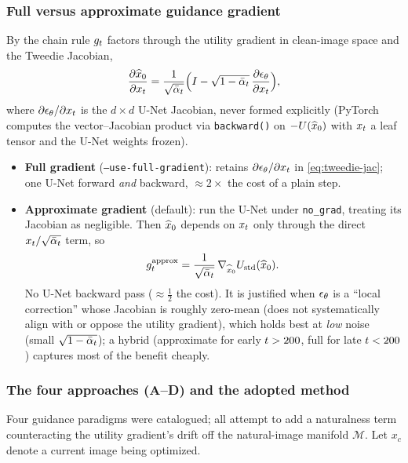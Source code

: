 \subsubsection{Full versus approximate guidance gradient}\label{sec:diff-approx}
By the chain rule $g_{t}$ factors through the utility gradient in clean-image
space and the Tweedie Jacobian,
\begin{equation}
\frac{\partial\widehat{x}_{0}}{\partial x_{t}}
   =\frac{1}{\sqrt{\bar{\alpha}_{t}}}\Big(I-\sqrt{1-\bar{\alpha}_{t}}\,\frac{\partial\epsilon_{\theta}}{\partial x_{t}}\Big),
\label{eq:tweedie-jac}
\end{equation}
where $\partial\epsilon_{\theta}/\partial x_{t}$ is the $d\times d$ U-Net Jacobian, never formed
explicitly (PyTorch computes the vector--Jacobian product via
\texttt{backward()} on $-U(\widehat{x}_{0})$ with $x_{t}$ a leaf tensor and the U-Net weights
frozen).
\begin{itemize}[leftmargin=1.4em,itemsep=1pt,topsep=2pt]
  \item \textbf{Full gradient} (\texttt{--use-full-gradient}): retains
        $\partial\epsilon_{\theta}/\partial x_{t}$ in \eqref{eq:tweedie-jac}; one U-Net forward
        \emph{and} backward, $\approx2\times$ the cost of a plain step.
  \item \textbf{Approximate gradient} (default): run the U-Net under
        \texttt{no\_grad}, treating its Jacobian as negligible. Then $\widehat{x}_{0}$
        depends on $x_{t}$ only through the direct $x_{t}/\sqrt{\bar{\alpha}_{t}}$ term, so
        \begin{equation}
        g_{t}^{\mathrm{approx}}=\frac{1}{\sqrt{\bar{\alpha}_{t}}}\,\nabla_{\widehat{x}_{0}}U_{\mathrm{std}}(\widehat{x}_{0}).
        \label{eq:approx-grad}
        \end{equation}
        No U-Net backward pass ($\approx\tfrac12$ the cost). It is justified when
        $\epsilon_{\theta}$ is a ``local correction'' whose Jacobian is roughly zero-mean
        (does not systematically align with or oppose the utility gradient), which
        holds best at \emph{low} noise (small $\sqrt{1-\bar{\alpha}_{t}}$); a hybrid
        (approximate for early $t>200$, full for late $t<200$) captures most
        of the benefit cheaply.
\end{itemize}

\subsubsection{The four approaches (A--D) and the adopted method}
\label{sec:diff-approaches}
Four guidance paradigms were catalogued; all attempt to add a naturalness term
counteracting the utility gradient's drift off the natural-image manifold
$\mathcal{M}$. Let $x_{c}$ denote a current image being optimized.

